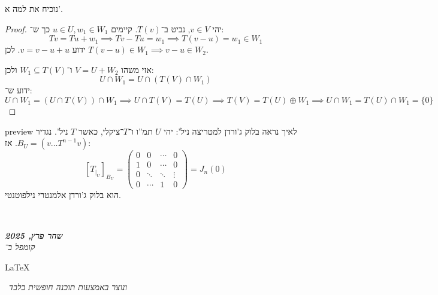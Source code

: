 \documentclass[]{article}
\newcommand\en[1] {\begin{otherlanguage}{english}#1\end{otherlanguage}}
\newcommand\ndoc  {\dotfill \\ \vfil {\begin{center}
            {\textbf{\textit{שחר פרץ, 2025}} \\
                \scriptsize \textit{קומפל ב־}\en{\LaTeX}\,\textit{ ונוצר באמצעות תוכנה חופשית בלבד}}
    \end{center}} \vfil	}
\newcommand\pms[1]    {\begin{pmatrix}
        #1
\end{pmatrix}}
\theoremstyle{definition}
\begin{document}
    נוכיח את למה א'. \begin{proof}
        יהי $v \in V$, נביט ב־$T(v)$. קיימים $u \in U, w_1 \in W_1$ כך ש־: 
        \[ Tv = Tu + w_1 \implies Tv - Tu = w_1 \implies T(v - u) = w_1 \in W_1 \]
        ידוע $v = v - u + u$. לכן $T(v - u) \in W_1 \implies v - u \in W_2$. 
        
        אזי משהו $V = U + W_2$ ו־$W_1 \subseteq T(V)$ ולכן: 
        \[ U \cap W_1 = U \cap (T(V) \cap W_1) \]
        ידוע ש־: 
        \[ U \cap W_1 = (U \cap T(V)) \cap W_1 \implies U \cap T(V) = T(U) \implies T(V) = T(U) \oplus W_1 \implies U \cap W_1 = T(U) \cap W_1 = \{0\} \]
    \end{proof}
    
    preview לאיך נראה בלוק ג'ורדן למטריצה ניל': 
    יהי $U$ תמ''ו ו־$T$־ציקלי, כאשר $T$ ניל'. נגדיר $B_U = (v \dots T^{n - 1}v)$. אז:
    \[ [T_{|_{U}}]_{B_U} = \pms{0 & 0 & \cdots & 0 \\ 1 & 0 & \cdots & 0\\ 0 & \ddots & \ddots & \vdots \\ 0 & \cdots & 1 & 0} = J_n(0) \]
    הוא בלוק ג'ורדן אלמנטרי נילפוטנטי. 
    
    \ndoc
\end{document}

